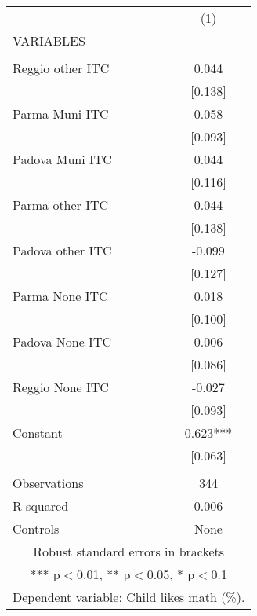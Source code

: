 \begin{tabular}{lc} \hline
 & (1) \\
VARIABLES &  \\ \hline
 &  \\
Reggio other ITC & 0.044 \\
 & [0.138] \\
Parma Muni ITC & 0.058 \\
 & [0.093] \\
Padova Muni ITC & 0.044 \\
 & [0.116] \\
Parma other ITC & 0.044 \\
 & [0.138] \\
Padova other ITC & -0.099 \\
 & [0.127] \\
Parma None ITC & 0.018 \\
 & [0.100] \\
Padova None ITC & 0.006 \\
 & [0.086] \\
Reggio None ITC & -0.027 \\
 & [0.093] \\
Constant & 0.623*** \\
 & [0.063] \\
 &  \\
Observations & 344 \\
R-squared & 0.006 \\
 Controls & None \\ \hline
\multicolumn{2}{c}{ Robust standard errors in brackets} \\
\multicolumn{2}{c}{ *** p$<$0.01, ** p$<$0.05, * p$<$0.1} \\
\multicolumn{2}{c}{ Dependent variable: Child likes math (\%).} \\
\end{tabular}
